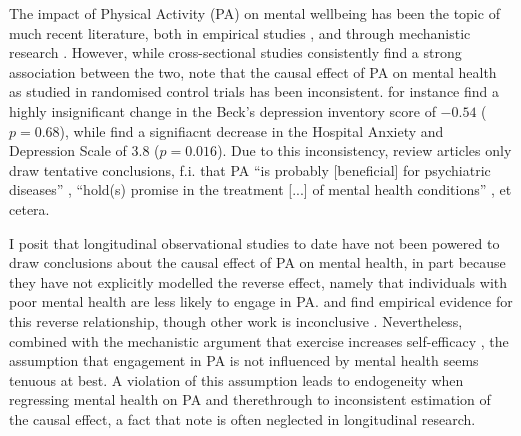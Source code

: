 The impact of Physical Activity (PA) on mental wellbeing has been the topic of much recent literature,
both in empirical studies \cite{noetel2024effect, mahindru2023role}, and through mechanistic research \cite{smith2021role}.
However, while cross-sectional studies consistently find a strong association between the two, 
note that the causal effect of PA on mental health as studied in randomised control trials has been inconsistent.
 for instance find a highly insignificant change in the Beck's depression inventory score
of $-0.54$ ($p = 0.68$), while  find a signifiacnt decrease in the Hospital Anxiety and
Depression Scale of $3.8$ ($p = 0.016$).
Due to this inconsistency, review articles only draw tentative conclusions, f.i. that PA ``is probably [beneficial]
for psychiatric diseases'' \cite{peluso2005physical}, ``hold(s) promise in the treatment [...] of mental health conditions''
\cite{smith2021role}, et cetera.

I posit that longitudinal observational studies to date have not been powered to draw conclusions about the causal effect
of PA on mental health, in part because they have not explicitly modelled the reverse effect, namely that individuals with poor
mental health are less likely to engage in PA.
 and  find empirical evidence for this reverse relationship,
though other work is inconclusive \cite{birkeland2009longitudinal, ku2012physical}. Nevertheless, combined with the
mechanistic argument that exercise increases self-efficacy \cite{smith2021role}, the assumption that engagement in PA is
not influenced by mental health seems tenuous at best.
A violation of this assumption leads to endogeneity when regressing mental health on PA and therethrough to
inconsistent estimation of the causal effect, a fact that  note is often neglected in
longitudinal research.

